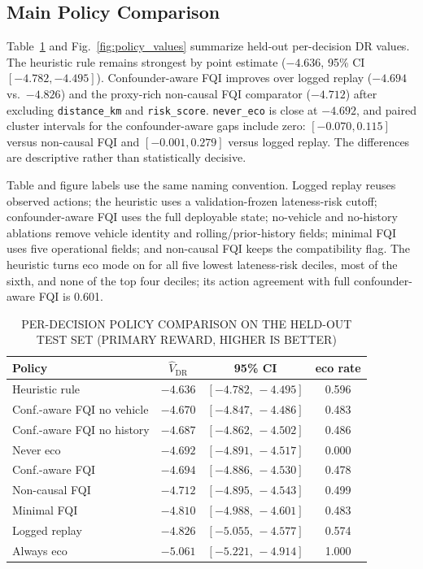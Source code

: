 \documentclass[a4paper,conference]{IEEEtran}
\begin{document}
\subsection{Main Policy Comparison}
Table~\ref{tab:main} and Fig.~\ref{fig:policy_values} summarize held-out per-decision DR values. The heuristic rule remains strongest by point estimate ($-4.636$, 95\% CI $[-4.782, -4.495]$). Confounder-aware FQI improves over logged replay ($-4.694$ vs.\ $-4.826$) and the proxy-rich non-causal FQI comparator ($-4.712$) after excluding \texttt{distance\_km} and \texttt{risk\_score}. \texttt{never\_eco} is close at $-4.692$, and paired cluster intervals for the confounder-aware gaps include zero: $[-0.070,0.115]$ versus non-causal FQI and $[-0.001,0.279]$ versus logged replay. The differences are descriptive rather than statistically decisive.

Table and figure labels use the same naming convention. Logged replay reuses observed actions; the heuristic uses a validation-frozen lateness-risk cutoff; confounder-aware FQI uses the full deployable state; no-vehicle and no-history ablations remove vehicle identity and rolling/prior-history fields; minimal FQI uses five operational fields; and non-causal FQI keeps the compatibility flag. The heuristic turns eco mode on for all five lowest lateness-risk deciles, most of the sixth, and none of the top four deciles; its action agreement with full confounder-aware FQI is 0.601.

\begin{table}[!t]
\caption{PER-DECISION POLICY COMPARISON ON THE HELD-OUT TEST SET (PRIMARY REWARD, HIGHER IS BETTER)}
\label{tab:main}
\centering
\footnotesize
\renewcommand{\arraystretch}{1.00}
\setlength{\tabcolsep}{2pt}
\begin{tabular}{lccc}
\toprule
\textbf{Policy} & $\hat{V}_{\text{DR}}$ & \textbf{95\% CI} & \textbf{eco rate} \\
\midrule
Heuristic rule       & $-4.636$ & $[-4.782,\, -4.495]$ & 0.596 \\
Conf.-aware FQI no vehicle & $-4.670$ & $[-4.847,\, -4.486]$ & 0.483 \\
Conf.-aware FQI no history & $-4.687$ & $[-4.862,\, -4.502]$ & 0.486 \\
Never eco            & $-4.692$ & $[-4.891,\, -4.517]$ & 0.000 \\
Conf.-aware FQI      & $-4.694$ & $[-4.886,\, -4.530]$ & 0.478 \\
Non-causal FQI       & $-4.712$ & $[-4.895,\, -4.543]$ & 0.499 \\
Minimal FQI          & $-4.810$ & $[-4.988,\, -4.601]$ & 0.483 \\
Logged replay        & $-4.826$ & $[-5.055,\, -4.577]$ & 0.574 \\
Always eco           & $-5.061$ & $[-5.221,\, -4.914]$ & 1.000 \\
\bottomrule
\end{tabular}
\end{table}
\end{document}
